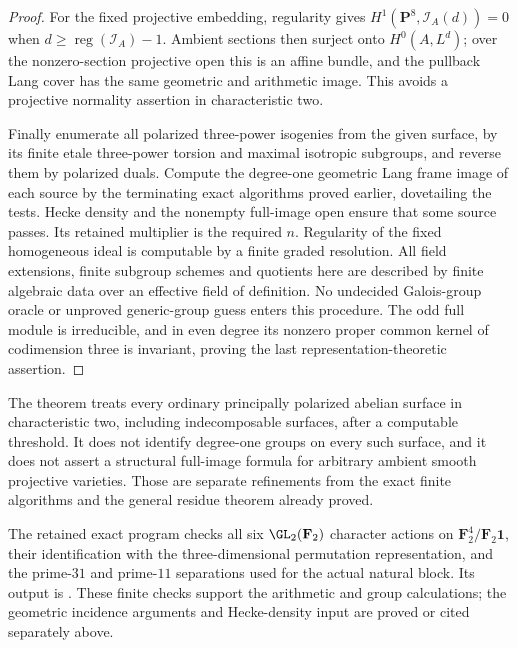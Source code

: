 \begin{proof}
For the fixed projective embedding, regularity gives
$H^1(\mathbf P^8,\mathcal I_A(d))=0$ when
$d\ge\operatorname{reg}(\mathcal I_A)-1$.
Ambient sections then surject onto $H^0(A,L^d)$; over the nonzero-section
projective open this is an affine bundle, and the pullback Lang cover
has the same geometric and arithmetic image. This avoids a projective
normality assertion in characteristic two.

Finally enumerate all polarized three-power isogenies from the given
surface, by its finite etale three-power torsion and maximal isotropic
subgroups, and reverse them by polarized duals. Compute the degree-one
geometric Lang frame image of each source by the terminating exact
algorithms proved earlier, dovetailing the tests. Hecke density and the
nonempty full-image open ensure that some source passes. Its retained
multiplier is the required $n$. Regularity of the fixed homogeneous ideal
is computable by a finite graded resolution. All field extensions,
finite subgroup schemes and quotients here are described by finite
algebraic data over an effective field of definition. No undecided
Galois-group oracle or unproved generic-group guess enters this procedure.
The odd full module is irreducible, and in even degree its nonzero proper
common kernel of codimension three is invariant, proving the last
representation-theoretic assertion.
\end{proof}

\begin{remark}\label{auto:A_monodromy:20bf13b82135}

The theorem treats every ordinary principally polarized abelian surface in
characteristic two, including indecomposable surfaces, after a computable
threshold. It does not identify degree-one groups on every such surface,
and it does not assert a structural full-image formula for arbitrary
ambient smooth projective varieties. Those are separate refinements from
the exact finite algorithms and the general residue theorem already proved.
\end{remark}

\begin{remark}\label{auto:A_monodromy:03a3e68c4a1c}

The retained exact program
checks all six $\GL_2(\mathbf F_2)$ character actions on
$\mathbf F_2^4/\mathbf F_2\mathbf1$, their identification with the
three-dimensional permutation representation, and the prime-$31$ and
prime-$11$ separations used for the actual natural block. Its output is
.
These finite checks support the arithmetic and group calculations; the
geometric incidence arguments and Hecke-density input are proved or cited
separately above.
\end{remark}

